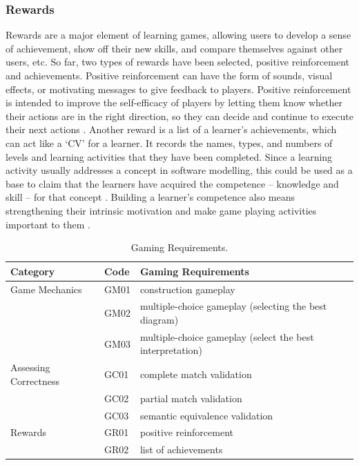\documentclass[10pt, a4paper]{report} \usepackage[titletoc]{appendix}
\begin{document}
\subsubsection{Rewards}
\label{Rewards}
Rewards are a major element of learning games, allowing users to develop a sense of achievement, show off their new skills, and compare themselves against other users, etc. So far, two types of rewards have been selected, positive reinforcement and achievements. Positive reinforcement can have the form of sounds, visual effects, or motivating messages to give feedback to players. Positive reinforcement is intended to improve the self-efficacy of players by letting them know whether their actions are in the right direction, so they can decide and continue to execute their next actions \cite{richter2015studying}. Another reward is a list of a learner's achievements, which can act like a `CV' for a learner. It records the names, types, and numbers of levels and learning activities that they have been completed. Since a learning activity usually addresses a concept in software modelling, this could be used as a base to claim that the learners have acquired the competence -- knowledge and skill -- for that concept \cite{richter2015studying}. Building a learner's competence also means strengthening their intrinsic motivation \cite{ryan2017self} and make game playing activities important to them \cite{nicholson2015recipe}.

\begin{table}[t!]
\caption{Gaming Requirements.}
\label{gaming-requirements}
\begin{center}
\begin{tabular}{ p{2cm}p{1cm}p{10cm} } 
\hline
Category & Code & Gaming Requirements\\
\hline
\multirow{1}{2cm}{Game Mechanics}
& GM01 & construction gameplay \cite{arnab2015mapping}\\
& GM02 & multiple-choice gameplay (selecting the best diagram)\\
& GM03 & multiple-choice gameplay (select the best interpretation)\\
\hline
\multirow{1}{2cm}{Assessing Correctness}
& GC01 & complete match validation\\
& GC02 & partial match validation\\
& GC03 & semantic equivalence validation\\
\hline
\multirow{1}{2cm}{Rewards}
& GR01 & positive reinforcement \cite{richter2015studying}\\
& GR02 & list of achievements \cite{richter2015studying}\\
\hline
\end{tabular}
\end{center}
\end{table}
\end{document}
